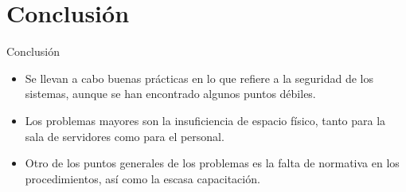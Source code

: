 \documentclass[spanish]{beamer}
\begin{document}
\section{Conclusión}
\begin{frame}{Conclusión}
  \begin{itemize}
  \item Se llevan a cabo buenas prácticas en lo que refiere a la seguridad de
    los sistemas, aunque se han encontrado algunos puntos débiles.
  \item Los problemas mayores son la insuficiencia de espacio físico, tanto
    para la sala de servidores como para el personal.
  \item Otro de los puntos generales de los problemas es la falta de normativa
    en los procedimientos, así como la escasa capacitación.
  \end{itemize}
\end{frame}
\end{document}
